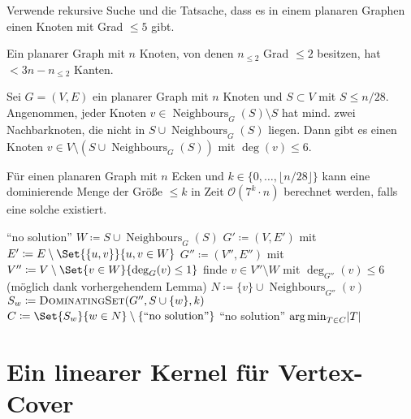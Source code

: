 \documentclass{cheat-sheet}
\newcommand{\size}[1]{\abs{#1}} %
\DeclareMathOperator*{\argmin}{arg\,min}
\renewcommand{\O}{\mathcal{O}} %
\newcommand{\floor}[1]{\lfloor #1 \rfloor} %
\DeclareMathOperator{\Neighbours}{Neighbours} %
\newcommand{\IndentState}[1]{\State \quad #1}
\begin{document}
\begin{idee}
  Verwende rekursive Suche und die Tatsache, dass es in einem planaren Graphen einen Knoten mit Grad $\leq 5$ gibt.
\end{idee}

\begin{lem}
  Ein planarer Graph mit $n$ Knoten, von denen $n_{\leq 2}$ Grad $\leq 2$ besitzen, hat $< 3 n - n_{\leq 2}$ Kanten.
\end{lem}

\begin{lem}
  Sei $G = (V, E)$ ein planarer Graph mit $n$ Knoten und $S \subset V$ mit $S \leq n/28$.
  Angenommen, jeder Knoten $v \in \Neighbours_G(S) \setminus S$ hat mind. zwei Nachbarknoten, die nicht in $S \cup \Neighbours_G(S)$ liegen.
  Dann gibt es einen Knoten $v \in V \setminus (S \cup \Neighbours_G(S))$ mit $\deg(v) \leq 6$.
\end{lem}

\begin{satz}
  Für einen planaren Graph mit $n$ Ecken und $k \in \{ 0, \ldots, \floor{n / 28} \}$ kann eine dominierende Menge der Größe $\leq k$ in Zeit $\O(7^k \cdot n)$ berechnet werden, falls eine solche existiert.
\end{satz}

\begin{algorithmic}
    \If{$\size{S} > k$} \Return ``no solution'' \EndIf
    \State $W \coloneqq S \cup \Neighbours_G(S)$
    \State $G' \coloneqq (V, E')$ mit $E' \coloneqq E \setminus \Set{\{ u, v \}}{u, v \in W}$
    \State $G'' \coloneqq (V'', E'')$ mit $V'' \coloneqq V \setminus \Set{v \in W}{\deg_G(v) \leq 1}$
    \State finde $v \in V'' \setminus W$ mit $\deg_{G''}(v) \leq 6$
    \IndentState (möglich dank vorhergehendem Lemma)
    \State $N \coloneqq \{ v \} \cup \Neighbours_{G''}(v)$
      $S_w \coloneqq \Call{DominatingSet}{G'', S \cup \{ w \}, k}$
    \EndFor
    \State $C \coloneqq \Set{S_w}{w \in N} \setminus \{ \text{``no solution''} \}$
     \Return ``no solution'' \EndIf
    \State \Return ${\argmin}_{T \in C} \size{T}$
  \EndFunction
\end{algorithmic}

\section{Ein linearer Kernel für Vertex-Cover}
\end{document}
